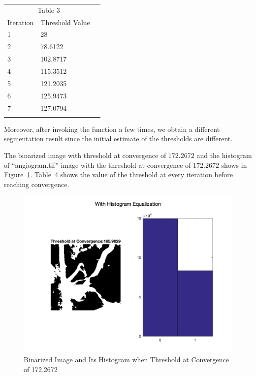 \documentclass[12pt, letter]{article}
\begin{document}
\begin{center}
\begin{tabular}{llr}  
\toprule
\multicolumn{2}{c}{Table 3} \\
\cmidrule(r){1-2}
Iteration   & Threshold Value \\
\midrule
1 & 28 \\
2 & 78.6122 \\
3 & 102.8717 \\
4 & 115.3512 \\
5 & 121.2035 \\
6 & 125.9473 \\
7 & 127.0794 \\

\bottomrule
\label{table:q2-2}
\end{tabular}    
\end{center}

Moreover, after invoking the function a few times, we obtain a different segmentation result since the initial estimate of the thresholds are different. 

The binarized image with threshold at convergence of $\mathbf{172.2672}$ and the histogram of ``angiogram.tif'' image with the threshold at convergence of $\mathbf{172.2672}$ shows in Figure~\ref{fig:q3-2}. Table~4 shows the value of the threshold at every iteration before reaching convergence.

\begin{figure}
    \centering
    \includegraphics[width=14cm]{q3-2.png}
    \caption{Binarized Image and Its Histogram when Threshold at Convergence of 172.2672}
    \label{fig:q3-2}
\end{figure}
\end{document}
